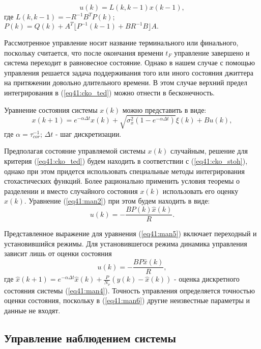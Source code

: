 \begin{equation}\label{eq41:man3}
u(k)=L(k,k-1)x(k-1),
\end{equation}
\noindent где $L(k,k-1)=-R^{-1}B^TP(k)$; $P(k)=Q(k)+A^T\lfloor P^{-1}(k-1)+BR^{-1}B\rfloor A.$

Рассмотренное управление носит название терминального или финального, поскольку считается, что после окончания времени $t_F$ управление завершено и система переходит в равновесное состояние.
Однако в нашем случае с помощью управления решается задача поддерживания того или иного состояния джиттера на притяжении довольно длительного времени. 
В этом случае верхний предел интегрирования в (\ref{eq41:cko_ted}) можно отнести в бесконечность.

Уравнение состояния системы $x(k)$ можно представить в виде:
\begin{equation}\label{eq41:man4}
x(k+1)=e^{-\alpha \Delta t}x(k)+\sqrt{\sigma^2_x(1-e^{-\alpha \Delta t})}\xi(k)+Bu(k),
\end{equation}
\noindent где $\alpha=\tau^{-1}_{cor}$; $\Delta t$ - шаг дискретизации.

Предполагая состояние управляемой системы $x(k)$ случайным, решение для критерия (\ref{eq41:cko_ted}) будем находить в соответствии с (\ref{eq41:cko_stoh}), однако при этом придется использовать специальные методы интегрирования стохастических функций.
Более рационально применить условия теоремы о разделении и вместо случайного состояния $x(k)$ использовать его оценку $\hat{x}(k)$. Уравнение (\ref{eq41:man2}) при этом будем находить в виде:
\begin{equation}\label{eq41:man5}
u(k)=-\frac{BP(k)\hat{x}(k)}{R}.
\end{equation}

Представленное выражение для уравнения (\ref{eq41:man5})  включает переходный и установившийся режимы. Для установившегося режима динамика управления зависит лишь от оценки состояния
\begin{equation}\label{eq41:man6}
u(k)=-\frac{BP\hat{x}(k)}{R},
\end{equation}
\noindent где $\hat x (k+1)=e^{-\alpha \Delta t}\hat x(k)+\frac{P}{N_\nu}(y(k)-\hat x(k))$ - оценка дискретного состояния системы (\ref{eq41:man4}).
Точность управления определяется точностью оценки состояния, поскольку в (\ref{eq41:man6}) другие неизвестные параметры и данные не входят.

\subsection{Управление наблюдением системы}

